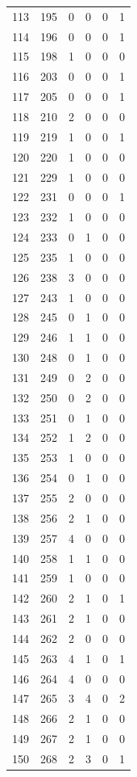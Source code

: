 \documentclass[
  letterpaper,
  DIV=11,
  numbers=noendperiod]{scrreprt}
\begin{document}
\begin{longtable}[]{@{}rrrrrr@{}}
113 & 195 & 0 & 0 & 0 & 1 \\
114 & 196 & 0 & 0 & 0 & 1 \\
115 & 198 & 1 & 0 & 0 & 0 \\
116 & 203 & 0 & 0 & 0 & 1 \\
117 & 205 & 0 & 0 & 0 & 1 \\
118 & 210 & 2 & 0 & 0 & 0 \\
119 & 219 & 1 & 0 & 0 & 1 \\
120 & 220 & 1 & 0 & 0 & 0 \\
121 & 229 & 1 & 0 & 0 & 0 \\
122 & 231 & 0 & 0 & 0 & 1 \\
123 & 232 & 1 & 0 & 0 & 0 \\
124 & 233 & 0 & 1 & 0 & 0 \\
125 & 235 & 1 & 0 & 0 & 0 \\
126 & 238 & 3 & 0 & 0 & 0 \\
127 & 243 & 1 & 0 & 0 & 0 \\
128 & 245 & 0 & 1 & 0 & 0 \\
129 & 246 & 1 & 1 & 0 & 0 \\
130 & 248 & 0 & 1 & 0 & 0 \\
131 & 249 & 0 & 2 & 0 & 0 \\
132 & 250 & 0 & 2 & 0 & 0 \\
133 & 251 & 0 & 1 & 0 & 0 \\
134 & 252 & 1 & 2 & 0 & 0 \\
135 & 253 & 1 & 0 & 0 & 0 \\
136 & 254 & 0 & 1 & 0 & 0 \\
137 & 255 & 2 & 0 & 0 & 0 \\
138 & 256 & 2 & 1 & 0 & 0 \\
139 & 257 & 4 & 0 & 0 & 0 \\
140 & 258 & 1 & 1 & 0 & 0 \\
141 & 259 & 1 & 0 & 0 & 0 \\
142 & 260 & 2 & 1 & 0 & 1 \\
143 & 261 & 2 & 1 & 0 & 0 \\
144 & 262 & 2 & 0 & 0 & 0 \\
145 & 263 & 4 & 1 & 0 & 1 \\
146 & 264 & 4 & 0 & 0 & 0 \\
147 & 265 & 3 & 4 & 0 & 2 \\
148 & 266 & 2 & 1 & 0 & 0 \\
149 & 267 & 2 & 1 & 0 & 0 \\
150 & 268 & 2 & 3 & 0 & 1 \\

\end{longtable}
\end{document}
